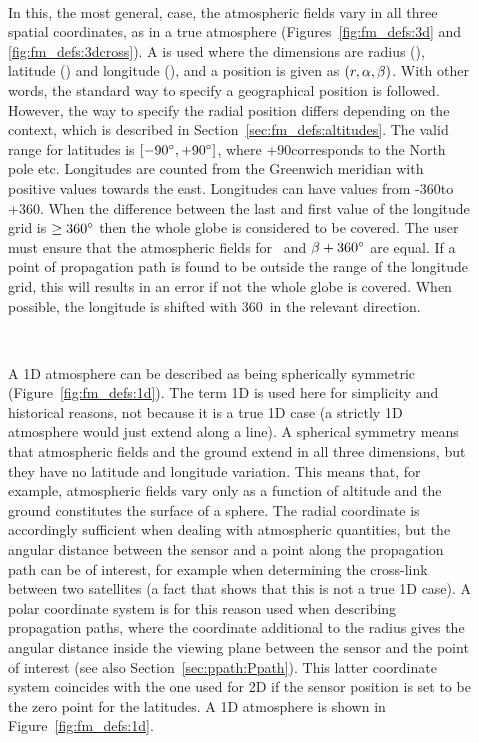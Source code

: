 \begin{description}
  
\item[\,\,\,] In this, the most general, case, the
  atmospheric fields vary in all three spatial coordinates, as in a
  true atmosphere (Figures~\ref{fig:fm_defs:3d} and
  \ref{fig:fm_defs:3dcross}). A  is used where the dimensions are radius (\Rds), latitude
  (\Lat) and longitude (\Lon), and a position is given as
  $(r,\alpha,\beta)$. With other words, the standard way to specify a
  geographical position is followed.  However, the way to specify the
  radial position differs depending on the context, which is described
  in Section~\ref{sec:fm_defs:altitudes}. The valid range for
  latitudes is $[-90^\circ,+90^\circ]$, where +90\degree corresponds
  to the North pole etc. Longitudes are counted from the Greenwich
  meridian with positive values towards the east. Longitudes can have
  values from -360\degree to +360\degree. When the difference between
  the last and first value of the longitude grid is $\geq 360^\circ$
  then the whole globe is considered to be covered. The user must
  ensure that the atmospheric fields for \Lon\ and $\beta+360^\circ$
  are equal. If a point of propagation path is found to be outside the
  range of the longitude grid, this will results in an error if not
  the whole globe is covered. When possible, the longitude is shifted with
  360\degree\ in the relevant direction.
  
\item[\,\,\,] A 1D atmosphere can be described as being
  spherically symmetric (Figure~\ref{fig:fm_defs:1d}). The term 1D is
  used here for simplicity and historical reasons, not because it is a
  true 1D case (a strictly 1D atmosphere would just extend along a
  line). A spherical symmetry means that atmospheric fields and the
  ground extend in all three dimensions, but they have no latitude and
  longitude variation. This means that, for example, atmospheric
  fields vary only as a function of altitude and the ground
  constitutes the surface of a sphere. The radial coordinate is
  accordingly sufficient when dealing with atmospheric quantities, but
  the angular distance between the sensor and a point along the
  propagation path can be of interest, for example when determining
  the cross-link between two satellites (a fact that shows that this
  is not a true 1D case). A polar coordinate system is for this reason
  used when describing propagation paths, where the coordinate
  additional to the radius gives the angular distance inside the
  viewing plane between the sensor and the point of interest (see also
  Section~\ref{sec:ppath:Ppath}). This latter coordinate system
  coincides with the one used for 2D if the sensor position is set to
  be the zero point for the latitudes. A 1D atmosphere is shown in
  Figure~\ref{fig:fm_defs:1d}.
  

\end{description}
